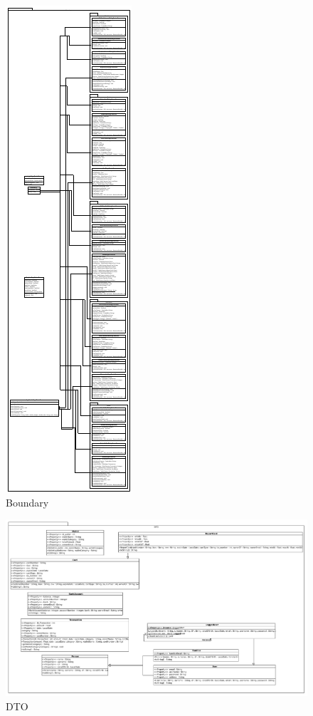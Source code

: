 \begin{figure}[!h]
    \centering
    \includegraphics[page=1,scale=4.5]{pdfs/Boundary.pdf}
    \caption{Boundary}\label{Boundary2}
\end{figure}

\begin{figure}[!h]
    \centering
    \includegraphics[scale=0.6]{pdfs/DTO.pdf}
    \caption{DTO}\label{DTO}
\end{figure}


